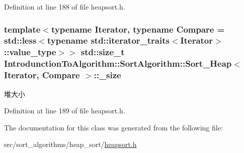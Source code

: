 Definition at line 188 of file heapsort.\+h.

\hypertarget{class_introdunction_to_algorithm_1_1_sort_algorithm_1_1_sort___heap_a3cbf6e8a1972cc62bce0b50226024a52}{}
\subsubsection[{\+\_\+size}]{\setlength{\rightskip}{0pt plus 5cm}template$<$typename Iterator, typename Compare = std\+::less$<$typename std\+::iterator\+\_\+traits$<$\+Iterator$>$\+::value\+\_\+type$>$$>$ std\+::size\+\_\+t {\bf Introdunction\+To\+Algorithm\+::\+Sort\+Algorithm\+::\+Sort\+\_\+\+Heap}$<$ Iterator, Compare $>$\+::\+\_\+size\hspace{0.3cm}{\ttfamily [private]}}\label{class_introdunction_to_algorithm_1_1_sort_algorithm_1_1_sort___heap_a3cbf6e8a1972cc62bce0b50226024a52}
堆大小 

Definition at line 189 of file heapsort.\+h.



The documentation for this class was generated from the following file\+:\begin{DoxyCompactItemize}
\item 
src/sort\+\_\+algorithms/heap\+\_\+sort/\hyperlink{heapsort_8h}{heapsort.\+h}\end{DoxyCompactItemize}
